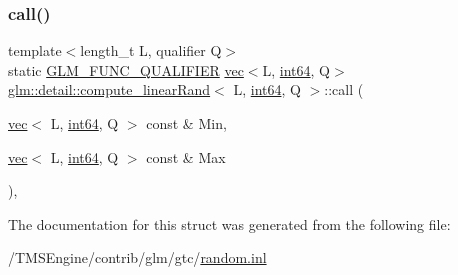 \subsubsection{\texorpdfstring{call()}{call()}}
{\footnotesize\ttfamily template$<$length\+\_\+t L, qualifier Q$>$ \\
static \hyperlink{setup_8hpp_a33fdea6f91c5f834105f7415e2a64407}{G\+L\+M\+\_\+\+F\+U\+N\+C\+\_\+\+Q\+U\+A\+L\+I\+F\+I\+ER} \hyperlink{structglm_1_1vec}{vec}$<$L, \hyperlink{namespaceglm_1_1detail_a5b1c3227ec636c24a0676746381adfc8}{int64}, Q$>$ \hyperlink{structglm_1_1detail_1_1compute__linear_rand}{glm\+::detail\+::compute\+\_\+linear\+Rand}$<$ L, \hyperlink{namespaceglm_1_1detail_a5b1c3227ec636c24a0676746381adfc8}{int64}, Q $>$\+::call (\begin{DoxyParamCaption}\item[{\hyperlink{structglm_1_1vec}{vec}$<$ L, \hyperlink{namespaceglm_1_1detail_a5b1c3227ec636c24a0676746381adfc8}{int64}, Q $>$ const \&}]{Min,  }\item[{\hyperlink{structglm_1_1vec}{vec}$<$ L, \hyperlink{namespaceglm_1_1detail_a5b1c3227ec636c24a0676746381adfc8}{int64}, Q $>$ const \&}]{Max }\end{DoxyParamCaption})\hspace{0.3cm}{\ttfamily [inline]}, {\ttfamily [static]}}



The documentation for this struct was generated from the following file\+:\begin{DoxyCompactItemize}
\item 
/\+T\+M\+S\+Engine/contrib/glm/gtc/\hyperlink{random_8inl}{random.\+inl}\end{DoxyCompactItemize}
